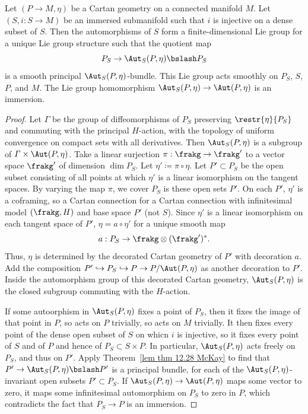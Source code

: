 \begin{thm}
    Let $(P\to M,\eta)$ be a Cartan geometry on a connected manifold $M$. Let $(S,i:S\to M)$ be an immersed submanifold such that $i$ is injective on a dense subset of $S$. Then the automorphisms of $S$ form a finite-dimensional Lie group for a unique Lie group structure such that the quotient map 
    \[P_S\to \Aut_S(P,\eta)\bslash P_S\]
    is a smooth principal $\Aut_S(P,\eta)$-bundle. This Lie group acts smoothly on $P_S$, $S$, $P$, and $M$. The Lie group homomorphism $\Aut_S(P,\eta)\to \Aut(P,\eta)$ is an immersion.
\end{thm}
\begin{proof}
    Let $\varGamma$ be the group of diffeomorphisms of $P_S$ preserving $\restr{\eta}{P_S}$ and commuting with the principal $H$-action, with the topology of uniform convergence on compact sets with all derivatives. Then $\Aut_S(P,\eta)$ is a subgroup of $\varGamma\times \Aut(P,\eta)$. Take a linear surjection $\pi:\frakg\to \frakg'$ to a vector space $\frakg'$ of dimension $\dim P_S$. Let $\eta'\coloneqq \pi\circ\eta$. Let $P'\subset P_S$ be the open subset consisting of all points at which $\eta'$ is a linear isomorphism on the tangent spaces. By varying the map $\pi$, we cover $P_S$ is these open sets $P'$. On each $P'$, $\eta'$ is a coframing, so a Cartan connection for a Cartan connection with infinitesimal model $(\frakg,H)$ and base space $P'$ (not $S$). Since $\eta'$ is a linear isomorphism on each tangent space of $P'$, $\eta=a\circ \eta'$ for a unique smooth map 
    \[a:P_S\to \frakg\otimes(\frakg')^\ast.\]
    Thus, $\eta$ is determined by the decorated Cartan geometry of $P'$ with decoration $a$. Add the composition $P'\hookrightarrow P_S\hookrightarrow P\to P\slash \Aut(P,\eta)$
    as another decoration to $P'$. Inside the automorphism group of this decorated Cartan geometry, $\Aut_S(P,\eta)$ is the closed subgroup commuting with the $H$-action.

    If some autoorphism in $\Aut_S(P,\eta)$ fixes a point of $P_S$, then it fixes the image of that point in $P$, so acts on $P$ trivially, so acts on $M$ trivially. It then fixes every point of the dense open subset of $S$ on whicn $i$ is injective, so it fixes every point of $S$ and of $P$ and hence of $P_S\subset S\times P$. In particular, $\Aut_S(P,\eta)$ acts freely on $P_S$, and thus on $P'$. Apply Theorem~\ref{lem thm 12.28 McKay} to find that $P'\to \Aut_S(P,\eta)\bslash P'$ is a principal bundle, for each of the $\Aut_S(P,\eta)$-invariant open subsets $P'\subset P_S$. If $\Aut_S(P,\eta)\to \Aut(P,\eta)$ maps some vector to zero, it maps some infinitesimal automorphism on $P_S$ to zero in $P$, which contradicts the fact that $P_S\to P$ is an immersion. 
\end{proof}

